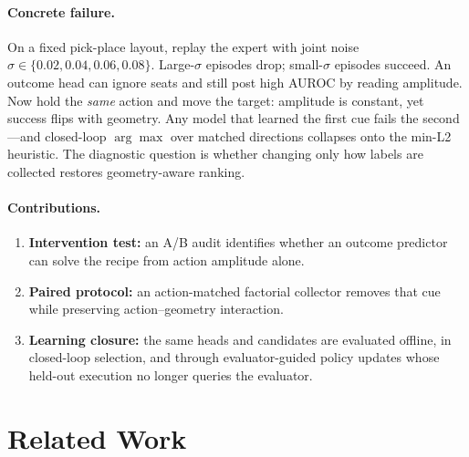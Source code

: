\documentclass[conference]{IEEEtran}
\begin{document}
\paragraph{Concrete failure.}
On a fixed pick-place layout, replay the expert with joint noise
$\sigma\in\{0.02,0.04,0.06,0.08\}$. Large-$\sigma$ episodes drop; small-$\sigma$
episodes succeed. An outcome head can ignore seats and still post high AUROC by
reading amplitude. Now hold the \emph{same} action and move the target:
amplitude is constant, yet success flips with geometry. Any model that learned
the first cue fails the second---and closed-loop $\arg\max$ over matched
directions collapses onto the min-L2 heuristic. The diagnostic question is
whether changing only how labels are collected restores geometry-aware ranking.

\paragraph{Contributions.}
\begin{enumerate}
\item \textbf{Intervention test:} an A/B audit identifies whether an outcome
predictor can solve the recipe from action amplitude alone.
\item \textbf{Paired protocol:} an action-matched factorial collector removes
that cue while preserving action--geometry interaction.
\item \textbf{Learning closure:} the same heads and candidates are evaluated
offline, in closed-loop selection, and through evaluator-guided policy updates
whose held-out execution no longer queries the evaluator.
\end{enumerate}



\section{Related Work}
\label{sec:related}
\end{document}
